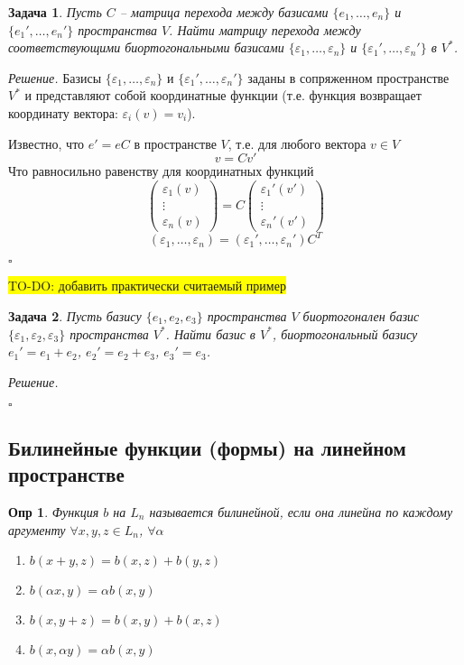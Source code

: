 \documentclass[a4paper,12pt]{article}
\newtheorem*{definition}{Опр}
\newtheorem*{prob}{Задача}
\newenvironment{soln}{\noindent\textit{Решение.}}{\hfill$\square$}
\begin{document}
\begin{prob}
	Пусть $C$ -- матрица перехода между базисами $\{e_1, \ldots, e_n\}$ и $\{e_1', \ldots, e_n'\}$ пространства $V$. Найти матрицу перехода между соответствующими биортогональными базисами $\{\varepsilon_1, \ldots, \varepsilon_n\}$ и $\{\varepsilon_1', \ldots, \varepsilon_n'\}$ в $V^*$.
\end{prob}
\begin{soln}
	Базисы $\{\varepsilon_1, \ldots, \varepsilon_n\}$ и $\{\varepsilon_1', \ldots, \varepsilon_n'\}$ заданы в сопряженном пространстве $V^*$ и представляют собой координатные функции (т.е. функция возвращает координату вектора: $\varepsilon_i(v) = v_i$). 
	
	Известно, что $e' = eC$ в пространстве $V$, т.е. для любого вектора $v \in V$ 
	\[
		v = C v'
	\]
	Что равносильно равенству для координатных функций
	\[
		\begin{pmatrix}
		 	\varepsilon_1(v) \\		 	
		 	\vdots \\
			\varepsilon_n(v)  
		\end{pmatrix} = C 
		\begin{pmatrix}
			\varepsilon_1'(v') \\		 	
			\vdots \\
			\varepsilon_n'(v')  
		\end{pmatrix}
 	\]
	\[
		(\varepsilon_1 , \ldots, \varepsilon_n) = (\varepsilon_1' , \ldots, \varepsilon_n') C^T
	\]
	
\end{soln}

\colorbox{yellow}{TO-DO: добавить практически считаемый пример}

\begin{prob}
	Пусть базису $\{e_1, e_2, e_3\}$ пространства $V$ биортогонален базис $\{\varepsilon_1, \varepsilon_2, \varepsilon_3\}$ пространства $V^*$. Найти базис в $V^*$, биортогональный базису $e_1' = e_1 + e_2$, $e_2' = e_2 + e_3$, $e_3' = e_3$.
\end{prob}
\begin{soln}
	
\end{soln}



\subsection{Билинейные функции (формы) на линейном пространстве}

\begin{definition}
	Функция $b$ на $L_n$ называется билинейной, если она линейна по каждому аргументу $\forall x, y, z \in L_n$, $\forall \alpha$	
	\begin{enumerate}
		\item $b(x+y, z) = b(x,z) + b(y,z)$
		\item $b(\alpha x, y) =\alpha b(x, y)$
		\item $b(x,y+ z) = b(x,y) + b(x,z)$
		\item $b(x, \alpha y) =\alpha b(x, y)$
	\end{enumerate}
\end{definition}
\end{document}
